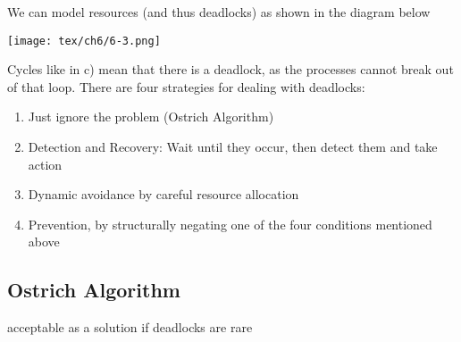 \documentclass{article}
\begin{document}
We can model resources (and thus deadlocks) as shown in the diagram below
\begin{center}
\texttt{[image: tex/ch6/6-3.png]}
\end{center}
Cycles like in c) mean that there is a deadlock, as the processes cannot break out of that loop.
There are four strategies for dealing with deadlocks:
\begin{enumerate}
	\item Just ignore the problem (Ostrich Algorithm)
	\item Detection and Recovery: Wait until they occur, then detect them and take action
	\item Dynamic avoidance by careful resource allocation
	\item Prevention, by structurally negating one of the four conditions mentioned above
\end{enumerate}
\subsection*{Ostrich Algorithm}
acceptable as a solution if deadlocks are rare
\end{document}
